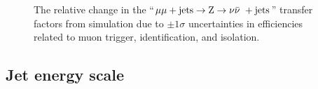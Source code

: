 \begin{figure}[!h]
{  } \\
   ~
  \caption{\label{fig:tfSyst_muonsf_mmZinv} The relative change in the
    ``$\mu\mu + \textrm{jets} \rightarrow {\text Z} \rightarrow \nu\bar{\nu}\ + \textrm{jets}$'' transfer factors from
    simulation due to $\pm1\sigma$ uncertainties in efficiencies
    related to muon trigger, identification, and isolation.  }
\end{figure}

\clearpage
\subsection{Jet energy scale}

